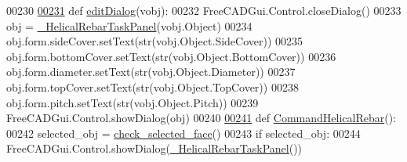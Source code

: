 \begin{DoxyCode}
00230 
\hypertarget{HelicalRebar_8py_source.tex_l00231}{}\hyperlink{namespaceHelicalRebar_ab9725ab4f1e5650133dba94c24907331}{00231} \textcolor{keyword}{def }\hyperlink{namespaceHelicalRebar_ab9725ab4f1e5650133dba94c24907331}{editDialog}(vobj):
00232     FreeCADGui.Control.closeDialog()
00233     obj = \hyperlink{classHelicalRebar_1_1__HelicalRebarTaskPanel}{\_HelicalRebarTaskPanel}(vobj.Object)
00234     obj.form.sideCover.setText(str(vobj.Object.SideCover))
00235     obj.form.bottomCover.setText(str(vobj.Object.BottomCover))
00236     obj.form.diameter.setText(str(vobj.Object.Diameter))
00237     obj.form.topCover.setText(str(vobj.Object.TopCover))
00238     obj.form.pitch.setText(str(vobj.Object.Pitch))
00239     FreeCADGui.Control.showDialog(obj)
00240 
\hypertarget{HelicalRebar_8py_source.tex_l00241}{}\hyperlink{namespaceHelicalRebar_ad8ff0caf1e8a56ac47ce25062db8bc46}{00241} \textcolor{keyword}{def }\hyperlink{namespaceHelicalRebar_ad8ff0caf1e8a56ac47ce25062db8bc46}{CommandHelicalRebar}():
00242     selected\_obj = \hyperlink{namespaceRebarfunc_adae2713855a7e1b4bda04081ae671542}{check\_selected\_face}()
00243     \textcolor{keywordflow}{if} selected\_obj:
00244         FreeCADGui.Control.showDialog(\hyperlink{classHelicalRebar_1_1__HelicalRebarTaskPanel}{\_HelicalRebarTaskPanel}())
\end{DoxyCode}
